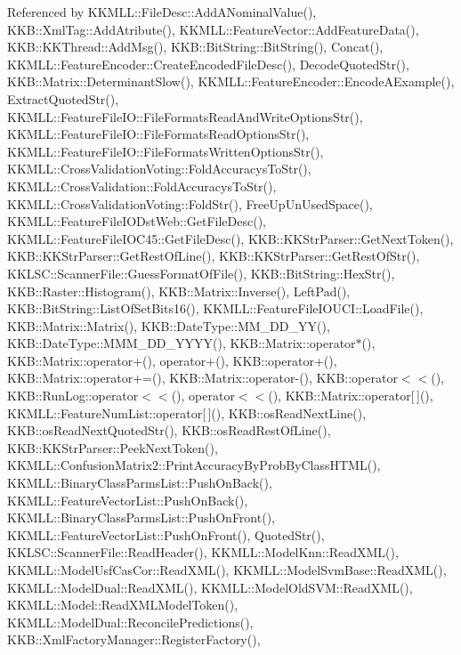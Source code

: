 Referenced by K\+K\+M\+L\+L\+::\+File\+Desc\+::\+Add\+A\+Nominal\+Value(), K\+K\+B\+::\+Xml\+Tag\+::\+Add\+Atribute(), K\+K\+M\+L\+L\+::\+Feature\+Vector\+::\+Add\+Feature\+Data(), K\+K\+B\+::\+K\+K\+Thread\+::\+Add\+Msg(), K\+K\+B\+::\+Bit\+String\+::\+Bit\+String(), Concat(), K\+K\+M\+L\+L\+::\+Feature\+Encoder\+::\+Create\+Encoded\+File\+Desc(), Decode\+Quoted\+Str(), K\+K\+B\+::\+Matrix\+::\+Determinant\+Slow(), K\+K\+M\+L\+L\+::\+Feature\+Encoder\+::\+Encode\+A\+Example(), Extract\+Quoted\+Str(), K\+K\+M\+L\+L\+::\+Feature\+File\+I\+O\+::\+File\+Formats\+Read\+And\+Write\+Options\+Str(), K\+K\+M\+L\+L\+::\+Feature\+File\+I\+O\+::\+File\+Formats\+Read\+Options\+Str(), K\+K\+M\+L\+L\+::\+Feature\+File\+I\+O\+::\+File\+Formats\+Written\+Options\+Str(), K\+K\+M\+L\+L\+::\+Cross\+Validation\+Voting\+::\+Fold\+Accuracys\+To\+Str(), K\+K\+M\+L\+L\+::\+Cross\+Validation\+::\+Fold\+Accuracys\+To\+Str(), K\+K\+M\+L\+L\+::\+Cross\+Validation\+Voting\+::\+Fold\+Str(), Free\+Up\+Un\+Used\+Space(), K\+K\+M\+L\+L\+::\+Feature\+File\+I\+O\+Dst\+Web\+::\+Get\+File\+Desc(), K\+K\+M\+L\+L\+::\+Feature\+File\+I\+O\+C45\+::\+Get\+File\+Desc(), K\+K\+B\+::\+K\+K\+Str\+Parser\+::\+Get\+Next\+Token(), K\+K\+B\+::\+K\+K\+Str\+Parser\+::\+Get\+Rest\+Of\+Line(), K\+K\+B\+::\+K\+K\+Str\+Parser\+::\+Get\+Rest\+Of\+Str(), K\+K\+L\+S\+C\+::\+Scanner\+File\+::\+Guess\+Format\+Of\+File(), K\+K\+B\+::\+Bit\+String\+::\+Hex\+Str(), K\+K\+B\+::\+Raster\+::\+Histogram(), K\+K\+B\+::\+Matrix\+::\+Inverse(), Left\+Pad(), K\+K\+B\+::\+Bit\+String\+::\+List\+Of\+Set\+Bits16(), K\+K\+M\+L\+L\+::\+Feature\+File\+I\+O\+U\+C\+I\+::\+Load\+File(), K\+K\+B\+::\+Matrix\+::\+Matrix(), K\+K\+B\+::\+Date\+Type\+::\+M\+M\+\_\+\+D\+D\+\_\+\+Y\+Y(), K\+K\+B\+::\+Date\+Type\+::\+M\+M\+M\+\_\+\+D\+D\+\_\+\+Y\+Y\+Y\+Y(), K\+K\+B\+::\+Matrix\+::operator$\ast$(), K\+K\+B\+::\+Matrix\+::operator+(), operator+(), K\+K\+B\+::operator+(), K\+K\+B\+::\+Matrix\+::operator+=(), K\+K\+B\+::\+Matrix\+::operator-\/(), K\+K\+B\+::operator$<$$<$(), K\+K\+B\+::\+Run\+Log\+::operator$<$$<$(), operator$<$$<$(), K\+K\+B\+::\+Matrix\+::operator\mbox{[}$\,$\mbox{]}(), K\+K\+M\+L\+L\+::\+Feature\+Num\+List\+::operator\mbox{[}$\,$\mbox{]}(), K\+K\+B\+::os\+Read\+Next\+Line(), K\+K\+B\+::os\+Read\+Next\+Quoted\+Str(), K\+K\+B\+::os\+Read\+Rest\+Of\+Line(), K\+K\+B\+::\+K\+K\+Str\+Parser\+::\+Peek\+Next\+Token(), K\+K\+M\+L\+L\+::\+Confusion\+Matrix2\+::\+Print\+Accuracy\+By\+Prob\+By\+Class\+H\+T\+M\+L(), K\+K\+M\+L\+L\+::\+Binary\+Class\+Parms\+List\+::\+Push\+On\+Back(), K\+K\+M\+L\+L\+::\+Feature\+Vector\+List\+::\+Push\+On\+Back(), K\+K\+M\+L\+L\+::\+Binary\+Class\+Parms\+List\+::\+Push\+On\+Front(), K\+K\+M\+L\+L\+::\+Feature\+Vector\+List\+::\+Push\+On\+Front(), Quoted\+Str(), K\+K\+L\+S\+C\+::\+Scanner\+File\+::\+Read\+Header(), K\+K\+M\+L\+L\+::\+Model\+Knn\+::\+Read\+X\+M\+L(), K\+K\+M\+L\+L\+::\+Model\+Usf\+Cas\+Cor\+::\+Read\+X\+M\+L(), K\+K\+M\+L\+L\+::\+Model\+Svm\+Base\+::\+Read\+X\+M\+L(), K\+K\+M\+L\+L\+::\+Model\+Dual\+::\+Read\+X\+M\+L(), K\+K\+M\+L\+L\+::\+Model\+Old\+S\+V\+M\+::\+Read\+X\+M\+L(), K\+K\+M\+L\+L\+::\+Model\+::\+Read\+X\+M\+L\+Model\+Token(), K\+K\+M\+L\+L\+::\+Model\+Dual\+::\+Reconcile\+Predictions(), K\+K\+B\+::\+Xml\+Factory\+Manager\+::\+Register\+Factory(), 